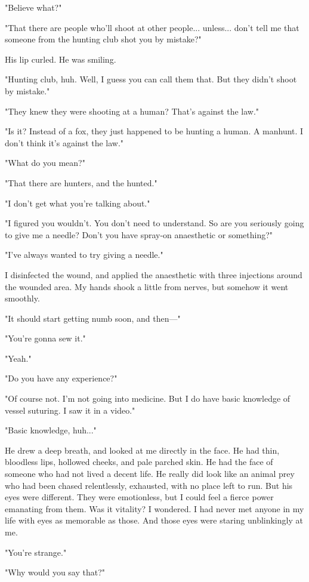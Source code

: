 "Believe what?"

"That there are people who'll shoot at other people... unless... don't
tell me that someone from the hunting club shot you by mistake?"

His lip curled. He was smiling.

"Hunting club, huh. Well, I guess you can call them that. But they
didn't shoot by mistake."

"They knew they were shooting at a human? That's against the law."

"Is it? Instead of a fox, they just happened to be hunting a human. A
manhunt. I don't think it's against the law."

"What do you mean?"

"That there are hunters, and the hunted."

"I don't get what you're talking about."

"I figured you wouldn't. You don't need to understand. So are you
seriously going to give me a needle? Don't you have spray-on anaesthetic
or something?"

"I've always wanted to try giving a needle."

I disinfected the wound, and applied the anaesthetic with three
injections around the wounded area. My hands shook a little from nerves,
but somehow it went smoothly.

"It should start getting numb soon, and then---"

"You're gonna sew it."

"Yeah."

"Do you have any experience?"

"Of course not. I'm not going into medicine. But I do have basic
knowledge of vessel suturing. I saw it in a video."

"Basic knowledge, huh..."

He drew a deep breath, and looked at me directly in the face. He had
thin, bloodless lips, hollowed cheeks, and pale parched skin. He had the
face of someone who had not lived a decent life. He really did look like
an animal prey who had been chased relentlessly, exhausted, with no
place left to run. But his eyes were different. They were emotionless,
but I could feel a fierce power emanating from them. Was it vitality? I
wondered. I had never met anyone in my life with eyes as memorable as
those. And those eyes were staring unblinkingly at me.

"You're strange."

"Why would you say that?"

